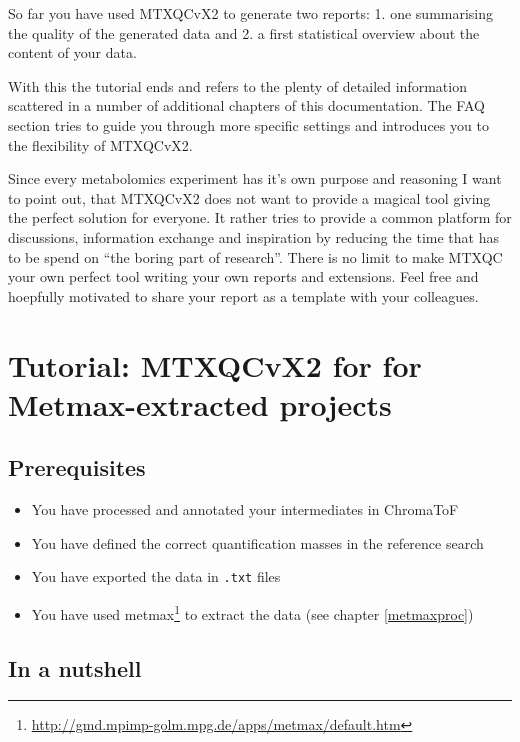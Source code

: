 \documentclass[]{book}
\providecommand{\tightlist}{%
  \setlength{\itemsep}{0pt}\setlength{\parskip}{0pt}}
\let\rmarkdownfootnote\footnote%
\def\footnote{\protect\rmarkdownfootnote}
\begin{document}
So far you have used MTXQCvX2 to generate two reports:
1. one summarising the quality of the generated data and
2. a first statistical overview about the content of your data.

With this the tutorial ends and refers to the plenty of detailed information scattered in a number of additional chapters of this documentation.
The FAQ section tries to guide you through more specific settings and introduces you to the flexibility of MTXQCvX2.

Since every metabolomics experiment has it's own purpose and reasoning I want to point out, that MTXQCvX2 does not want to provide a magical tool giving the perfect solution for everyone. It rather tries to provide a common platform for discussions, information exchange and inspiration by reducing the time that has to be spend on ``the boring part of research''. There is no limit to make MTXQC your own perfect tool writing your own reports and extensions. Feel free and hoepfully motivated to share your report as a template with your colleagues.

\hypertarget{metmax}{%
\chapter{Tutorial: MTXQCvX2 for for Metmax-extracted projects}\label{metmax}}

\hypertarget{prerequisites-1}{%
\section{Prerequisites}\label{prerequisites-1}}

\begin{itemize}
\tightlist
\item
  You have processed and annotated your intermediates in ChromaToF
\item
  You have defined the correct quantification masses in the reference search
\item
  You have exported the data in \texttt{.txt} files
\item
  You have used metmax\footnote{\url{http://gmd.mpimp-golm.mpg.de/apps/metmax/default.htm}} to extract the data (see chapter \ref{metmaxproc})
\end{itemize}

\hypertarget{in-a-nutshell}{%
\section{In a nutshell}\label{in-a-nutshell}}
\end{document}
